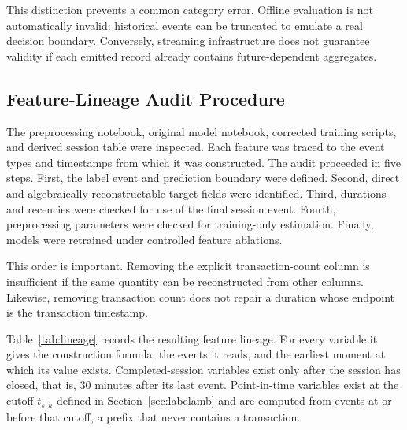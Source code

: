 \documentclass[conference, letterpaper]{IEEEtran}
\begin{document}
This distinction prevents a common category error. Offline evaluation is not automatically invalid: historical events can be truncated to emulate a real decision boundary. Conversely, streaming infrastructure does not guarantee validity if each emitted record already contains future-dependent aggregates.

\subsection{Feature-Lineage Audit Procedure}
The preprocessing notebook, original model notebook, corrected training scripts, and derived session table were inspected. Each feature was traced to the event types and timestamps from which it was constructed. The audit proceeded in five steps. First, the label event and prediction boundary were defined. Second, direct and algebraically reconstructable target fields were identified. Third, durations and recencies were checked for use of the final session event. Fourth, preprocessing parameters were checked for training-only estimation. Finally, models were retrained under controlled feature ablations.

This order is important. Removing the explicit transaction-count column is insufficient if the same quantity can be reconstructed from other columns. Likewise, removing transaction count does not repair a duration whose endpoint is the transaction timestamp.

Table~\ref{tab:lineage} records the resulting feature lineage. For every variable it gives the construction formula, the events it reads, and the earliest moment at which its value exists. Completed-session variables exist only after the session has closed, that is, 30 minutes after its last event. Point-in-time variables exist at the cutoff $t_{s,k}$ defined in Section~\ref{sec:labelamb} and are computed from events at or before that cutoff, a prefix that never contains a transaction.
\end{document}
